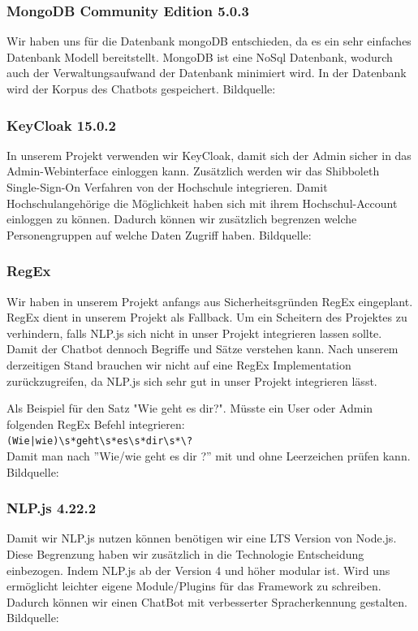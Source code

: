 \subsubsection{MongoDB Community Edition 5.0.3}
Wir haben uns für die Datenbank mongoDB entschieden, da es ein sehr einfaches Datenbank Modell bereitstellt.
MongoDB ist eine NoSql Datenbank, wodurch auch der Verwaltungsaufwand der Datenbank minimiert wird.
In der Datenbank wird der Korpus des Chatbots gespeichert.
Bildquelle:\cite{mongodbicon}

\subsubsection{KeyCloak 15.0.2}
In unserem Projekt verwenden wir KeyCloak, damit sich der Admin sicher in das Admin-Webinterface einloggen kann.
Zusätzlich werden wir das Shibboleth Single-Sign-On Verfahren von der Hochschule integrieren.
Damit Hochschulangehörige die Möglichkeit haben sich mit ihrem Hochschul-Account einloggen zu können.
Dadurch können wir zusätzlich begrenzen welche Personengruppen auf welche Daten Zugriff haben.
Bildquelle:\cite{keycloakicon}

\newpage
\subsubsection{RegEx}
Wir haben in unserem Projekt anfangs aus Sicherheitsgründen RegEx eingeplant.
RegEx dient in unserem Projekt als Fallback.
Um ein Scheitern des Projektes zu verhindern, falls NLP.js sich nicht in unser Projekt integrieren lassen sollte.
Damit der Chatbot dennoch Begriffe und Sätze verstehen kann.
Nach unserem derzeitigen Stand brauchen wir nicht auf eine RegEx Implementation zurückzugreifen,
da NLP.js sich sehr gut in unser Projekt integrieren lässt. 

\noindent \newline Als Beispiel für den Satz "Wie geht es dir?".
Müsste ein User oder Admin folgenden RegEx Befehl integrieren:\\
\newline \verb/(Wie|wie)\s*geht\s*es\s*dir\s*\?/ \\
\newline Damit man nach ''Wie/wie geht es dir ?'' mit und ohne Leerzeichen prüfen kann.\\
Bildquelle:\cite{regexicon}

\subsubsection{NLP.js 4.22.2}
Damit wir NLP.js nutzen können benötigen wir eine LTS Version von Node.js.
Diese Begrenzung haben wir zusätzlich in die Technologie Entscheidung einbezogen.
Indem NLP.js ab der Version 4 und höher modular ist. Wird uns ermöglicht leichter eigene Module/Plugins
für das Framework zu schreiben.
Dadurch können wir einen ChatBot mit verbesserter Spracherkennung gestalten.
Bildquelle:\cite{nlpicon}